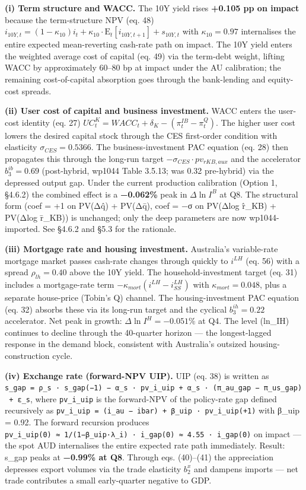 \documentclass[
]{article}
\begin{document}
\textbf{(i) Term structure and WACC.} The 10Y yield rises \textbf{+0.105
pp on impact} because the term-structure NPV (eq. 48)
\(i_{10Y,t} = (1-\kappa_{10}) i_t + \kappa_{10} \cdot \mathrm{E}_t[i_{10Y,t+1}] + s_{10Y,t}\)
with \(\kappa_{10} = 0.97\) internalises the entire expected
mean-reverting cash-rate path on impact. The 10Y yield enters the
weighted average cost of capital (eq. 49) via the term-debt weight,
lifting WACC by approximately 60--80 bp at impact under the AU
calibration; the remaining cost-of-capital absorption goes through the
bank-lending and equity-cost spreads.

\textbf{(ii) User cost of capital and business investment.} WACC enters
the user-cost identity (eq. 27)
\(UC^K_t = WACC_t + \delta_K - (\pi^{IB}_t - \pi^Q_t)\). The higher user
cost lowers the desired capital stock through the CES first-order
condition with elasticity \(\sigma_{CES} = 0.5366\). The
business-investment PAC equation (eq. 28) then propagates this through
the long-run target \(-\sigma_{CES} \cdot pv_{rKB,aux}\) and the
accelerator \(b_3^{ib} = 0.69\) (post-hybrid, wp1044 Table 3.5.13; was
0.32 pre-hybrid) via the depressed output gap. Under the current
production calibration (Option 1, §4.6.2) the combined effect is a
\textbf{−0.062\%} peak in \(\Delta \ln I^B\) at Q8. The structural form
(coef = +1 on PV(Δq̂) + PV(Δq̄), coef = −σ on PV(Δlog r̂\_KB) + PV(Δlog
r̄\_KB)) is unchanged; only the deep parameters are now wp1044-imported.
See §4.6.2 and §5.3 for the rationale.

\textbf{(iii) Mortgage rate and housing investment.} Australia's
variable-rate mortgage market passes cash-rate changes through quickly
to \(i^{LH}\) (eq. 56) with a spread \(\rho_{lh} = 0.40\) above the 10Y
yield. The household-investment target (eq. 31) includes a mortgage-rate
term \(-\kappa_{mort}(i^{LH} - i^{LH}_{SS})\) with
\(\kappa_{mort} = 0.048\), plus a separate house-price (Tobin's Q)
channel. The housing-investment PAC equation (eq. 32) absorbs these via
its long-run target and the cyclical \(b_3^{ih} = 0.22\) accelerator.
Net peak in growth: \(\Delta \ln I^H = -0.051\%\) at Q4. The level
(ln\_IH) continues to decline through the 40-quarter horizon --- the
longest-lagged response in the demand block, consistent with Australia's
outsized housing-construction cycle.

\textbf{(iv) Exchange rate (forward-NPV UIP).} UIP (eq. 38) is written
as
\texttt{s\_gap\ =\ ρ\_s\ ·\ s\_gap(−1)\ −\ α\_s\ ·\ pv\_i\_uip\ +\ α\_s\ ·\ (π\_au\_gap\ −\ π\_us\_gap)\ +\ ε\_s},
where \texttt{pv\_i\_uip} is the forward-NPV of the policy-rate gap
defined recursively as
\texttt{pv\_i\_uip\ =\ (i\_au\ −\ ibar)\ +\ β\_uip\ ·\ pv\_i\_uip(+1)}
with β\_uip = 0.92. The forward recursion produces
\texttt{pv\_i\_uip(0)\ ≈\ 1/(1−β\_uip·λ\_i)\ ·\ i\_gap(0)\ ≈\ 4.55\ ·\ i\_gap(0)}
on impact --- the spot AUD internalises the entire expected rate path
immediately. Result: s\_gap peaks at \textbf{−0.99\% at Q8}. Through
eqs. (40)--(41) the appreciation depresses export volumes via the trade
elasticity \(b_2^x\) and dampens imports --- net trade contributes a
small early-quarter negative to GDP.
\end{document}
